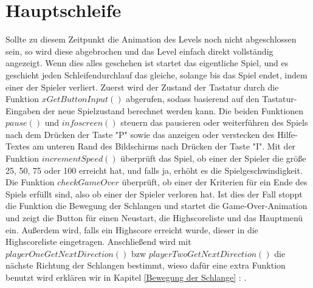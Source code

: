 \section{Hauptschleife}
\label{Hauptschleife}
%
Sollte zu diesem Zeitpunkt die Animation des Levels noch nicht abgeschlossen sein, so wird diese abgebrochen und das Level einfach direkt vollständig angezeigt.
Wenn dies alles geschehen ist startet das eigentliche Spiel, und es geschieht jeden Schleifendurchlauf das gleiche, solange bis das Spiel endet, indem einer der Spieler verliert.
Zuerst wird der Zustand der Tastatur durch die Funktion $xGetButtonInput()$ abgerufen, sodass basierend auf den Tastatur-Eingaben der neue Spielzustand berechnet werden kann. Die beiden Funktionen $pause()$ und $infoscreen()$ steuern das pausieren oder weiterführen des Spiels nach dem Drücken der Taste "P" sowie das anzeigen oder verstecken des Hilfe-Textes am unteren Rand des Bildschirms nach Drücken der Taste "I". Mit der Funktion $incrementSpeed()$ überprüft das Spiel, ob einer der Spieler die größe 25, 50, 75 oder 100 erreicht hat, und falls ja, erhöht es die Spielgeschwindigkeit. Die Funktion $checkGameOver$ überprüft, ob einer der Kriterien für ein Ende des Spiels erfüllt sind, also ob einer der Spieler verloren hat. Ist dies der Fall stoppt die Funktion die Bewegung der Schlangen und startet die Game-Over-Animation und zeigt die Button für einen Neustart, die Highscoreliste und das Hauptmenü ein. Außerdem wird, falls ein Highscore erreicht wurde, dieser in die Highscoreliste eingetragen.
Anschließend wird mit $playerOneGetNextDirection()$ bzw $playerTwoGetNextDirection()$ die nächste Richtung der Schlangen bestimmt, wieso dafür eine extra Funktion benutzt wird erklären wir in Kapitel \ref{Bewegung der Schlange}  : .
